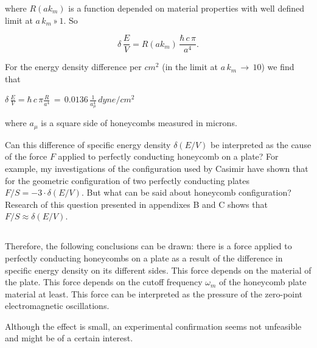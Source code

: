 \documentclass[twoside, 10pt, ptm]{article}
\def\myvspacebeforesubsection{-2.0mm}
\def\myvspaceaftersubsection{-2.5mm}
\begin{document}
\begin{multicols}{2}
    where \(R\left(a k_m\right)\) is a function depended on material
properties with well defined limit at \(a\,k_m\,»\,1\). So

    \begin{equation}
\delta\,\frac{E}{V} = R\left(a k_m\right)\,\frac{\hbar\,c\,\pi}{a^4}.
\end{equation}

    For the energy density difference per \(cm^2\) (in the limit at
\(a\,k_m\,\rightarrow \,10\)) we find that

    \(\delta\,\frac{E}{V} = \hbar\,c\, \pi\frac{R}{a^4}\,=\,0.0136\,\frac{1}{a_{\mu}^4}\,dyne/cm^2\)

    where \(a_{\mu}\) is a square side of honeycombs measured in microns.


    Can this difference of specific energy density
\(\delta\left(E/V\right)\) be interpreted as the cause of the force
\(F\) applied to perfectly conducting honeycomb on a plate? For example,
my investigations of the configuration used by Casimir have shown that for the
geometric configuration of two perfectly conducting plates
\(F/S = -3 \cdot \delta\left(E/V\right)\). But what can be said about honeycomb
configuration? Research of this question presented in appendixes B and C
shows that \(F/S \approx \delta\left(E/V\right)\).


\vspace{\myvspacebeforesubsection}
    \subsection*{}\label{conclusions}
\vspace{\myvspaceaftersubsection}


    Therefore, the following conclusions can be drawn: there is a force applied
to perfectly conducting honeycombs on a plate as a result of the
difference in specific energy density on its different sides. This force
depends on the material of the plate. This force depends
on the cutoff frequency \(\omega_m\) of the honeycomb plate material at least.
This force can be interpreted as the pressure of the zero-point
electromagnetic oscillations.

    Although the effect is small, an experimental confirmation seems not
unfeasible and might be of a certain interest.


\end{multicols}
\end{document}
